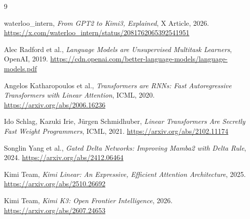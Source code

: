 \begin{thebibliography}{9}

waterloo\_intern,
\textit{From GPT2 to Kimi3, Explained},
X Article, 2026.
\url{https://x.com/waterloo_intern/status/2081762065392541951}

Alec Radford et al.,
\textit{Language Models are Unsupervised Multitask Learners},
OpenAI, 2019.
\url{https://cdn.openai.com/better-language-models/language-models.pdf}

Angelos Katharopoulos et al.,
\textit{Transformers are RNNs: Fast Autoregressive Transformers with Linear Attention},
ICML, 2020.
\url{https://arxiv.org/abs/2006.16236}

Ido Schlag, Kazuki Irie, Jürgen Schmidhuber,
\textit{Linear Transformers Are Secretly Fast Weight Programmers},
ICML, 2021.
\url{https://arxiv.org/abs/2102.11174}

Songlin Yang et al.,
\textit{Gated Delta Networks: Improving Mamba2 with Delta Rule},
2024.
\url{https://arxiv.org/abs/2412.06464}

Kimi Team,
\textit{Kimi Linear: An Expressive, Efficient Attention Architecture},
2025.
\url{https://arxiv.org/abs/2510.26692}

Kimi Team,
\textit{Kimi K3: Open Frontier Intelligence},
2026.
\url{https://arxiv.org/abs/2607.24653}

\end{thebibliography}
